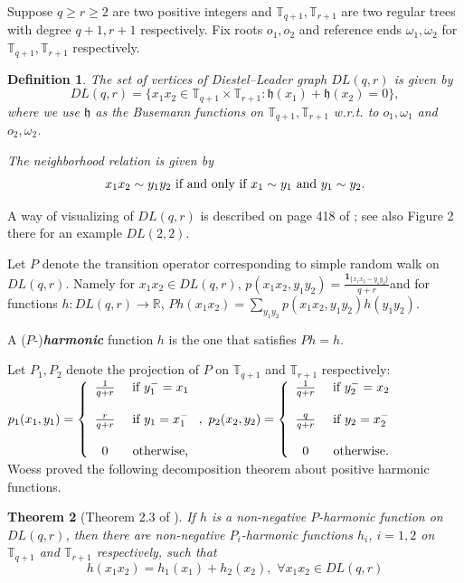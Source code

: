 \documentclass[12pt]{article}
\newtheorem{theorem}{Theorem}[section]
\newtheorem{definition}[theorem]{Definition}
\numberwithin{equation}{section}
\newcommand{\1}{\mathbf{1}}
\newcommand{\notion}[1]{{\bf  \textit{#1}}}
\begin{document}
 Suppose $q\geq r\geq2$ are two positive integers and $\mathbb{T}_{q+1},\mathbb{T}_{r+1}$ are two regular trees with degree $q+1,r+1$ respectively. Fix roots $o_1,o_2$ and reference ends $\omega_1,\omega_2$ for $\mathbb{T}_{q+1},\mathbb{T}_{r+1}$ respectively. 
 \begin{definition}
 	The set of vertices of Diestel--Leader graph $DL(q,r)$ is given by 
 	\[
   DL(q,r)=\{ x_1x_2\in \mathbb{T}_{q+1}\times\mathbb{T}_{r+1}: \mathfrak{h}(x_1)+\mathfrak{h}(x_2)=0 \},
 	\]
 	where we use $\mathfrak{h}$ as the Busemann functions on $\mathbb{T}_{q+1},\mathbb{T}_{r+1}$ w.r.t. to $o_1,\omega_1$ and $o_2,\omega_2$.
 	
 	The neighborhood relation is given by 
 	\[
 	x_1x_2\sim y_1y_2 \textnormal{ if and only if } x_1\sim y_1 \textnormal{ and }y_1\sim y_2.
 	\]
 \end{definition}
 A way of visualizing of $DL(q,r)$ is described on page 418 of \cite{Woess2005}; see also Figure 2 there for an example $DL(2,2)$.
 
 
 
 Let $P$ denote the transition operator corresponding to simple random walk on $DL(q,r)$. Namely for $x_1x_2\in DL(q,r)$, $p(x_1x_2,y_1y_2)=\frac{\mathbf{1}_{\{x_1x_2\sim y_1y_2\}}}{q+r}$and for functions $h:DL(q,r)\rightarrow \mathbb{R}$, $Ph(x_1x_2)=\sum_{y_1y_2}p(x_1x_2,y_1y_2)h(y_1y_2)$.
 
 A ($P$-)\notion{harmonic} function $h$ is the one that satisfies $Ph=h$.
 
 Let $P_1,P_2$ denote the projection of $P$ on $\mathbb{T}_{q+1}$ and $\mathbb{T}_{r+1}$ respectively: \\
 $p_1(x_1,y_1)=\left\{
 \begin{array}{cc}
 \frac{1}{q+r} & \textnormal{ if } y_1^-=x_1\\
  & \\
 \frac{r}{q+r} & \textnormal{ if }y_1=x_1^-\\
  & \\
 0 & \textnormal{ otherwise,}
 \end{array}
 \right. , \,\, 
 p_2(x_2,y_2)=\left\{
 \begin{array}{cc}
 \frac{1}{q+r} & \textnormal{ if } y_2^-=x_2\\
 & \\
 \frac{q}{q+r} & \textnormal{ if }y_2=x_2^-\\
 & \\
 0 & \textnormal{ otherwise.}
 \end{array}
 \right.
 $\\
 Woess proved the following decomposition theorem about positive harmonic functions.
 \begin{theorem}[Theorem 2.3 of \cite{Woess2005}]\label{thm: decom of PH}
 	If $h$ is a non-negative $P$-harmonic function on $DL(q,r)$, then there are non-negative $P_i$-harmonic functions $h_i$, $i=1,2$ on $\mathbb{T}_{q+1}$ and $\mathbb{T}_{r+1}$ respectively, such that \[
 	h(x_1x_2)=h_1(x_1)+h_2(x_2),\, \, \forall x_1x_2\in DL(q,r)
 	\]
 \end{theorem}
 
\end{document}
